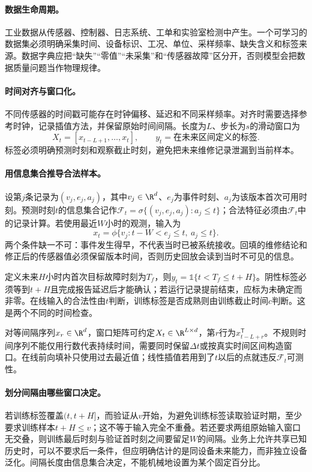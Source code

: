 \paragraph{数据生命周期。}
工业数据从传感器、控制器、日志系统、工单和实验室检测中产生。一个可学习的数据集必须明确采集时间、设备标识、工况、单位、采样频率、缺失含义和标签来源。数据字典应把“缺失”“零值”“未采集”和“传感器故障”区分开，否则模型会把数据质量问题当作物理规律。

\paragraph{时间对齐与窗口化。}
不同传感器的时间戳可能存在时钟偏移、延迟和不同采样频率。对齐时需要选择参考时钟，记录插值方法，并保留原始时间间隔。长度为$L$、步长为$s$的滑动窗口为
\begin{equation}
 X_t=[x_{t-L+1},\ldots,x_t],
 \qquad y_t=\text{在未来区间定义的标签}.
\end{equation}
标签必须明确预测时刻和观察截止时刻，避免把未来维修记录泄漏到当前样本。

\paragraph{用信息集合推导合法样本。}
设第$j$条记录为$(v_j,e_j,a_j)$，其中$v_j\in\R^d$、$e_j$为事件时刻、$a_j$为该版本首次可用时刻。预测时刻$t$的信息集合记作$\mathcal F_t=\sigma\{(v_j,e_j,a_j):a_j\leq t\}$；合法特征必须由$\mathcal F_t$中的记录计算。若使用最近$W$小时的观测，输入为
\begin{equation}
 x_t=\phi\{v_j:t-W<e_j\leq t,\ a_j\leq t\}.
\end{equation}
两个条件缺一不可：事件发生得早，不代表当时已被系统接收。回填的维修结论和修正后的传感器值必须保留版本时间，否则历史回放会读到当时不可见的信息。

定义未来$H$小时内首次目标故障时刻为$T_f$，则$y_t=\mathbb 1\{t<T_f\leq t+H\}$。阴性标签必须等到$t+H$且完成报告延迟后才能确认；若运行记录提前结束，应标为未确定而非零。在线输入的合法性由$t$判断，训练标签是否成熟则由训练截止时间$c$判断。这是两个不同的时间检查。

对等间隔序列$x_r\in\R^d$，窗口矩阵可约定$X_t\in\R^{L\times d}$，第$r$行为$x_{t-L+r}^{\mathsf T}$。不规则时间序列不能仅用行数代表持续时间，需要同时保留$\Delta t$或按真实时间区间构造窗口。在线前向填补只使用过去最近值；线性插值若用到了$t$以后的点就违反$\mathcal F_t$可测性。

\paragraph{划分间隔由哪些窗口决定。}
若训练标签覆盖$(t,t+H]$，而验证从$v$开始，为避免训练标签读取验证时期，至少要求训练样本$t+H\leq v$；这不等于输入完全不重叠。若还要求两组原始输入窗口无交叠，则训练最后时刻与验证首时刻之间要留足$W$的间隔。业务上允许共享已知历史时，可以不要求后一条件，但应明确估计的是同设备未来能力，而非独立设备泛化。间隔长度由信息集合决定，不能机械地设置为某个固定百分比。

